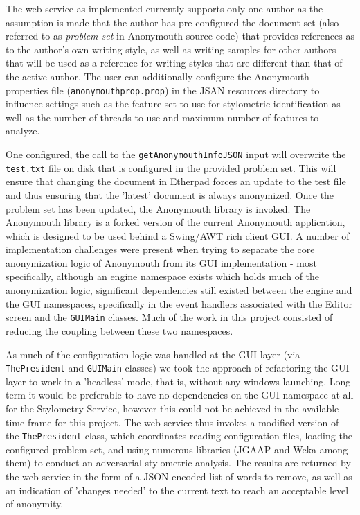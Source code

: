 \documentclass[letterpaper]{article}
\begin{document}
The web service as implemented currently supports only one author as the
assumption is made that the author has pre-configured the document set
(also referred to as \emph{problem set} in Anonymouth source code) that provides
references as to the author's own writing style, as well as writing
samples for other authors that will be used as a reference for writing
styles that are different than that of the active author. The user can
additionally configure the Anonymouth properties file
(\texttt{anonymouthprop.prop}) in the JSAN resources directory to influence
settings such as the feature set to use for stylometric identification
as well as the number of threads to use and maximum number of features
to analyze.

One configured, the call to the \texttt{getAnonymouthInfoJSON} input
will overwrite the \texttt{test.txt} file on disk that is configured
in the provided problem set. This will ensure that changing the
document in Etherpad forces an update to the test file and thus
ensuring that the 'latest' document is always anonymized. Once the
problem set has been updated, the Anonymouth library is invoked. The
Anonymouth library is a forked version of the current Anonymouth
application, which is designed to be used behind a Swing/AWT rich
client GUI. A number of implementation challenges were present when
trying to separate the core anonymization logic of Anonymouth from its
GUI implementation - most specifically, although an engine namespace
exists which holds much of the anonymization logic, significant
dependencies still existed between the engine and the GUI
namespaces, specifically in the event handlers associated with the
Editor screen and the \texttt{GUIMain} classes. Much of the work in
this project consisted of reducing the coupling between these two
namespaces.

As much of the configuration logic was handled at the GUI layer (via
\texttt{ThePresident} and \texttt{GUIMain} classes) we took the
approach of refactoring the GUI layer to work in a 'headless' mode,
that is, without any windows launching. Long-term it would be
preferable to have no dependencies on the GUI namespace at all for the
Stylometry Service, however this could not be achieved in the
available time frame for this project. The web service thus invokes a
modified version of the \texttt{ThePresident} class, which coordinates
reading configuration files, loading the configured problem set, and
using numerous libraries (JGAAP and Weka among them) to conduct an
adversarial stylometric analysis. The results are returned by the web
service in the form of a JSON-encoded list of words to remove, as well
as an indication of 'changes needed' to the current text to reach an
acceptable level of anonymity.
\end{document}
